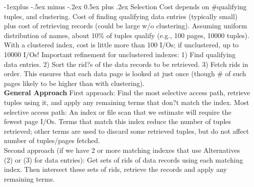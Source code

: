 \documentclass[12pt,landscape]{article}
\makeatletter
\renewcommand{\subsection}{\@startsection{subsection}{2}{0mm}%
                                {-1explus -.5ex minus -.2ex}%
                                {0.5ex plus .2ex}%
                                {\normalfont\normalsize\bfseries}}
\makeatother
\begin{document}
\begin{multicols}{3}
\subsection{Selection}
Cost depends on \#qualifying tuples, and clustering. Cost of finding qualifying data entries (typically small) plus cost of retrieving records (could be large w/o clustering). Assuming uniform distribution of names, about 10\% of tuples qualify (e.g., 100 pages, 10000 tuples). With a clustered index, cost is little more than 100 I/Os; if unclustered, up to 10000 I/Os! Important refinement for unclustered indexes: 1) Find qualifying data entries. 2)  Sort the rid?s of the data records to be retrieved. 3) Fetch rids in order. This ensures that each data page is looked at just once (though \# of such pages likely to be higher than with clustering).\\
{\bf General Approach}  First approach: Find the most selective access path, retrieve tuples using it, and apply any remaining terms that don?t match the index. Most selective access path: An index or file scan that we estimate will require the fewest page I/Os. Terms that match this index reduce the number of tuples retrieved; other terms are used to discard some retrieved tuples, but do not affect number of tuples/pages fetched. \\
Second approach (if we have 2 or more matching indexes that use Alternatives (2) or (3) for data entries): Get sets of rids of data records using each matching index. Then intersect these sets of rids, retrieve the records and apply any remaining terms.


\end{multicols}
\end{document}
